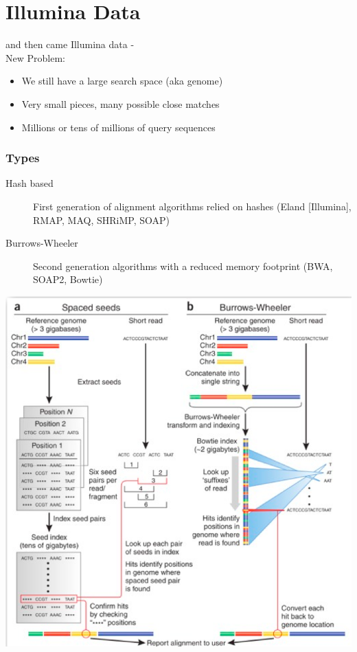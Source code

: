\documentclass[pdf]{beamer}
\begin{document}
\section{Illumina Data}
\begin{frame}
and then came Illumina data -\\
New Problem:\\
\begin{itemize}
\item We still have a large search space (aka genome)
\item Very small pieces, many possible close matches
\item Millions or tens of millions of query sequences
\end{itemize}
\end{frame}

\begin{frame}
  \frametitle{Types}
  \begin{description}
  \item[Hash based] First generation of alignment algorithms relied on hashes (Eland [Illumina], RMAP, MAQ, SHRiMP, SOAP)
  \item [Burrows-Wheeler] Second generation algorithms with a reduced memory footprint (BWA, SOAP2, Bowtie)
  \end{description}
\end{frame}

\begin{frame}
\begin{center}
\includegraphics[scale=.32]{Figures/hashVsBW.png} 
\end{center}
\end{frame}
\end{document}
